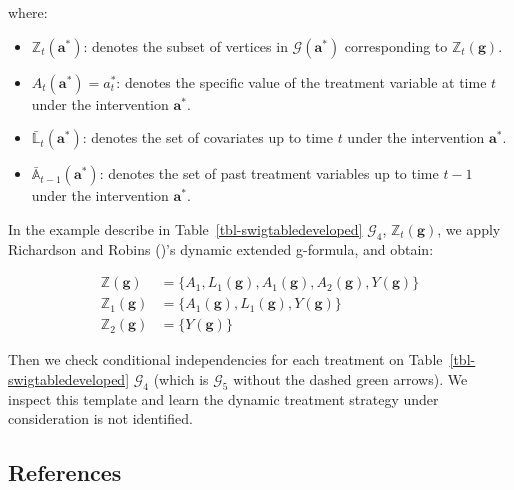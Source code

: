 \documentclass[
  single column]{article}
\providecommand{\tightlist}{%
  \setlength{\itemsep}{0pt}\setlength{\parskip}{0pt}}\usepackage{longtable,booktabs,array}
\begin{document}
where:

\begin{itemize}
\tightlist
\item
  \textbf{\(\mathbb{Z}_t(\mathbf{a}^*)\)}: denotes the subset of
  vertices in \(\mathcal{G}(\mathbf{a}^*)\) corresponding to
  \(\mathbb{Z}_t(\mathbf{g})\).
\item
  \textbf{\(A_t(\mathbf{a}^*) = a^*_t\)}: denotes the specific value of
  the treatment variable at time \(t\) under the intervention
  \(\mathbf{a}^*\).
\item
  \textbf{\(\bar{\mathbb{L}}_t(\mathbf{a}^*)\)}: denotes the set of
  covariates up to time \(t\) under the intervention \(\mathbf{a}^*\).
\item
  \textbf{\(\bar{\mathbb{A}}_{t-1}(\mathbf{a}^*)\)}: denotes the set of
  past treatment variables up to time \(t-1\) under the intervention
  \(\mathbf{a}^*\).
\end{itemize}

In the example describe in Table~\ref{tbl-swigtabledeveloped}
\(\mathcal{G}_4\), \(\mathbb{Z}_t(\mathbf{g})\), we apply Richardson and
Robins ()'s dynamic extended
g-formula, and obtain:

\[
\begin{aligned}
\mathbb{Z}(\mathbf{g}) &= \{A_1, L_1(\mathbf{g}), A_1(\mathbf{g}), A_2(\mathbf{g}), Y(\mathbf{g})\} \\
\mathbb{Z}_1(\mathbf{g}) &= \{A_1(\mathbf{g}), L_1(\mathbf{g}), Y(\mathbf{g})\} \\
\mathbb{Z}_2(\mathbf{g}) &= \{Y(\mathbf{g})\}
\end{aligned}
\]

Then we check conditional independencies for each treatment on
Table~\ref{tbl-swigtabledeveloped} \(\mathcal{G}_4\) (which is
\(\mathcal{G}_5\) without the dashed green arrows). We inspect this
template and learn the dynamic treatment strategy under consideration is
not identified.

\newpage{}

\subsection{References}\label{references}
\end{document}
